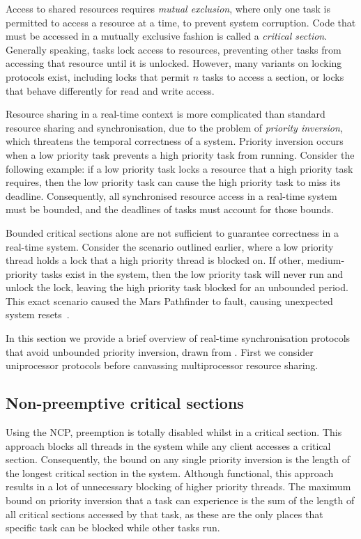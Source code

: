 Access to shared resources requires \emph{mutual exclusion}, where only one 
task is permitted to access a resource at a time, to prevent system corruption. Code that
must be accessed in a mutually exclusive fashion is called a \emph{critical section}. Generally
speaking, tasks lock access to resources, preventing other tasks from accessing that resource
until it is unlocked. However, many variants on locking protocols exist, including locks that permit
$n$ tasks to access a section, or locks that behave differently for read and write access.

Resource sharing in a real-time context is more complicated than standard resource sharing and
synchronisation, due to the problem of \emph{priority inversion}, which threatens the temporal
correctness of a system.  Priority inversion occurs when a low priority task prevents a high
priority task from running.  Consider the following example: if a low priority task locks a resource
that a high priority task requires, then the low priority task can cause the high priority task to
miss its deadline.  Consequently, all synchronised resource access in a real-time system must be
bounded, and the deadlines of tasks must account for those bounds.

Bounded critical sections alone are not sufficient to guarantee correctness in a real-time
system. Consider the scenario outlined earlier, where a low priority thread holds a lock that a high
priority thread is blocked on.  If other, medium-priority tasks exist in the system, then the low
priority task will never run and unlock the lock, leaving the high priority task blocked for an
unbounded period.  This exact scenario caused the Mars Pathfinder to fault, causing unexpected
system resets~\citep{Mars_Pathfinder}.

In this section we provide a brief overview of real-time synchronisation protocols that
avoid unbounded priority inversion, drawn from \citet{Sha_RL_90}. First we consider uniprocessor
protocols before canvassing multiprocessor resource sharing.

\subsection{Non-preemptive critical sections}

Using the \gls{NCP}, preemption is totally disabled whilst in a critical section.  This approach blocks
all threads in the system while any client accesses a critical section.  Consequently, the bound on
any single priority inversion is the length of the longest critical section in the system.  Although
functional, this approach results in a lot of unnecessary blocking of higher priority threads.  The
maximum bound on priority inversion that a task can experience is the sum of the length of all
critical sections accessed by that task, as these are the only places that specific task can be
blocked while other tasks run. 

